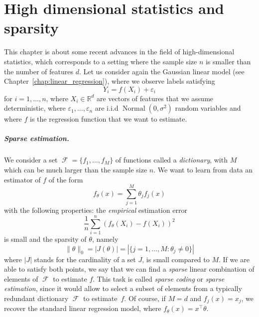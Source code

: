 \documentclass[
	fontsize=11pt, %
	twoside=false, %
	numbers=noenddot, %
]{kaobook}
\DeclareMathOperator{\cF}{{\mathcal F}}
\DeclareMathOperator{\nor}{Normal}
\newcommand{\eps}{\varepsilon}
\newcommand{\R}{\mathbb R}
\newcommand{\norm}[1]{\| #1 \|}
\begin{document}
\mainmatter %


% 

% 

% 

% 

% 

\setchapterpreamble[u]{\margintoc}
\chapter{High dimensional statistics and sparsity}
\label{chap:high_dimensional_statistics}

This chapter is about some recent advances in the field of high-dimensional statistics, which corresponds to a setting where the sample size $n$ is smaller than the number of features $d$.
Let us consider again the Gaussian linear model (see Chapter~\ref{chap:linear_regression}), where we observe labels satisfying
\begin{equation*}
	Y_i = f(X_i) + \eps_i
\end{equation*}
for $i=1, \ldots, n$, where $X_i \in \R^d$ are vectors of features that we assume deterministic, where $\eps_1, \ldots, \eps_n$ are i.i.d $\nor(0, \sigma^2)$ random variables and where $f$ is the regression function that we want to estimate.


\paragraph{Sparse estimation.}

We consider a set $\cF = \{ f_1, \ldots, f_M \}$ of functions called a \emph{dictionary}, with $M$ which can be much larger than the sample size $n$.  
We want to learn from data an estimator of $f$ of the form
\begin{equation*}
	f_\theta(x) = \sum_{j=1}^M \theta_j f_j(x)
\end{equation*}
with the following properties: the \emph{empirical} estimation error
\begin{equation*}
	\frac 1n \sum_{i=1}^n (f_\theta(X_i) - f(X_i))^2
\end{equation*}
is small and the sparsity of $\theta$, namely
\begin{equation*}
	\norm{\theta}_0 = |J(\theta)| = | \{ j=1, \ldots, M : \theta_j \neq 0\} |
\end{equation*}
where $|J|$ stands for the cardinality of a set $J$, is small compared to $M$.
If we are able to satisfy both points, we say that we can find a \emph{sparse} linear combination of elements of $\cF$ to estimate $f$.
This task is called \emph{sparse coding} or \emph{sparse estimation}, since it would allow to select a subset of elements from a typically redundant dictionary $\cF$ to estimate~$f$.
Of course, if $M = d$ and $f_j(x) = x_j$, we recover the standard linear regression model, where $f_\theta(x) = x^\top \theta$.
\end{document}

